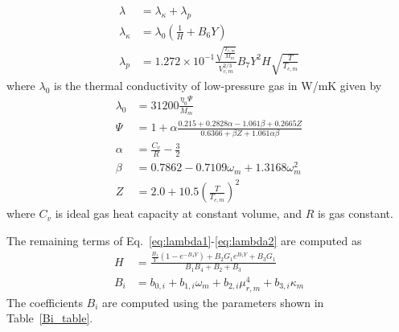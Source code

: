 \begin{align}
    \lambda &= \lambda_{\kappa} +\lambda_p \\
    \lambda_{\kappa} &= \lambda_0 \left( \frac{1}{H}+B_6 Y \right)  \label{eq:lambda1}\\
    \lambda_p &= 1.272\times 10^{-1}\frac{\sqrt{\frac{ T_{c,m}}{M_m}}}{V_{c,m}^{2/3}}B_7Y^2H \sqrt{\frac{T}{T_{c,m}}}\label{eq:lambda2}
\end{align}
where $\lambda_0$ is the thermal conductivity of low-pressure gas in W/mK given by 
\begin{align}
    \lambda_0 &=31200 \frac{\eta_0\Psi}{M_m}\\
    \Psi &= 1 +\alpha\frac{0.215 + 0.2828\alpha-1.061\beta+0.2665Z }{0.6366 +\beta Z +1.061\alpha \beta }\\
    \alpha &= \frac{C_v}{R} -\frac{3}{2}\\
    \beta &= 0.7862 - 0.7109 \omega_m + 1.3168 \omega_m^2\\
    Z &= 2.0+10.5 \left(\frac{T}{T_{c,m}}\right)^2
\end{align}
where $C_v$ is ideal gas heat capacity at constant volume, and $R$ is gas constant.

The remaining terms of Eq.~\ref{eq:lambda1}-\ref{eq:lambda2} are computed as
\begin{align}
    H &= \frac{\frac{B_1}{Y}\left(1-e^{-B_4Y}\right) +B_2G_1 e^{B_5Y}+B_3 G_1}{B_1B_4 +B_2 +B_3}\\
    B_{i} &= b_{0,i} + b_{1,i}\omega_m + b_{2,i} \mu_{r,m}^4 + b_{3,i} \kappa_m
\end{align}
The coefficients $B_i$ are computed using the parameters shown in Table~\ref{Bi_table}.


